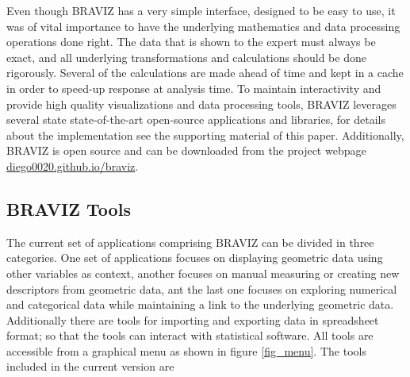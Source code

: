 \documentclass[utf8,paper]{frontiersSCNS} %
\begin{document}
Even though BRAVIZ has a very simple interface, designed to be easy to use, it was of vital importance to have the underlying mathematics and data processing operations done right. The data that is shown to the expert must always be exact, and all underlying transformations and calculations should be done rigorously. Several of the calculations are made ahead of time and kept in a cache in order to speed-up response at analysis time. 
To maintain interactivity and provide high quality visualizations and data processing tools, BRAVIZ leverages several state state-of-the-art open-source applications and libraries, for details about the implementation see the supporting material of this paper. Additionally, BRAVIZ is open source and can be downloaded from the project webpage \url{diego0020.github.io/braviz}. 


\subsection{BRAVIZ Tools}


The current set of applications comprising BRAVIZ can be divided in three categories. One set of applications focuses on displaying geometric data using other variables as context, another focuses on manual measuring or creating new descriptors from geometric data, ant the last one focuses on exploring numerical and categorical data while maintaining a link to the underlying geometric data. Additionally there are tools for importing and exporting data in spreadsheet format; so that the tools can interact with statistical software. All tools are accessible from a graphical menu as shown in figure \ref{fig_menu}. The tools included in the current version are
\end{document}
